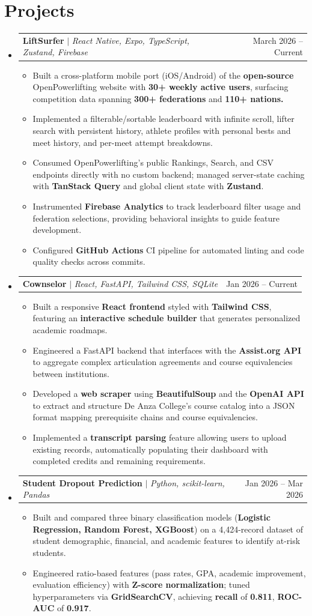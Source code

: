 \documentclass[letterpaper,11pt]{article}
\makeatletter
\newcommand{\resumeItem}[1]{
  \item\small{
    {#1 \vspace{-2pt}}
  }
}
\newcommand{\resumeProjectHeading}[2]{
    \item
    \begin{tabular*}{0.97\textwidth}{l@{\extracolsep{\fill}}r}
      \small#1 & #2 \\
    \end{tabular*}\vspace{-7pt}
}
\newcommand{\resumeSubHeadingListStart}{\begin{itemize}[leftmargin=0.15in, label={}]}
\newcommand{\resumeSubHeadingListEnd}{\end{itemize}}
\newcommand{\resumeItemListStart}{\begin{itemize}}
\newcommand{\resumeItemListEnd}{\end{itemize}\vspace{-5pt}}
\makeatother
\begin{document}
\section{Projects}
    \resumeSubHeadingListStart
      \resumeProjectHeading
    {\textbf{LiftSurfer} $|$ \emph{React Native, Expo, TypeScript, Zustand, Firebase}}{March 2026 -- Current}
    \resumeItemListStart
      \resumeItem{Built a cross-platform mobile port (iOS/Android) of the \textbf{open-source} OpenPowerlifting website with \textbf{30+ weekly active users}, surfacing competition data spanning \textbf{300+ federations} and \textbf{110+ nations.}}
      \resumeItem{Implemented a filterable/sortable leaderboard with infinite scroll, lifter search with persistent history, athlete profiles with personal bests and meet history, and per-meet attempt breakdowns.}
      \resumeItem{Consumed OpenPowerlifting's public Rankings, Search, and CSV endpoints directly with no custom backend; managed server-state caching with \textbf{TanStack Query} and global client state with \textbf{Zustand}.}
      \resumeItem{Instrumented \textbf{Firebase Analytics} to track leaderboard filter usage and federation selections, providing behavioral insights to guide feature development.}
      \resumeItem{Configured \textbf{GitHub Actions} CI pipeline for automated linting and code quality checks across commits.}
    \resumeItemListEnd
      \resumeProjectHeading
          {\textbf{Cownselor} $|$ \emph{React, FastAPI, Tailwind CSS, SQLite}}{Jan 2026 -- Current}
          \resumeItemListStart
            \resumeItem{Built a responsive \textbf{React frontend }styled with \textbf{Tailwind CSS}, featuring an \textbf{interactive schedule builder} that generates personalized academic roadmaps.}
            \resumeItem{Engineered a FastAPI backend that interfaces with the \textbf{Assist.org API }to aggregate complex articulation agreements and course equivalencies between institutions.}
            \resumeItem{Developed a \textbf{web scraper} using \textbf{BeautifulSoup} and the \textbf{OpenAI API} to extract and structure De Anza College's course catalog into a JSON format mapping prerequisite chains and course equivalencies.}
            \resumeItem{Implemented a \textbf{transcript parsing }feature allowing users to upload existing records, automatically populating their dashboard with completed credits and remaining requirements.}
          \resumeItemListEnd
      \resumeProjectHeading
          {\textbf{Student Dropout Prediction} $|$ \emph{Python, scikit-learn, Pandas}}{Jan 2026 -- Mar 2026}
          \resumeItemListStart
            \resumeItem{Built and compared three binary classification models (\textbf{Logistic Regression, Random Forest, XGBoost}) on a 4,424-record dataset of student demographic, financial, and academic features to identify at-risk students.}
            \resumeItem{Engineered ratio-based features (pass rates, GPA, academic improvement, evaluation efficiency) with \textbf{Z-score normalization}; tuned hyperparameters via \textbf{GridSearchCV}, achieving \textbf{recall} of \textbf{0.811},\textbf{ ROC-AUC} of \textbf{0.917}.}
          \resumeItemListEnd
    \resumeSubHeadingListEnd
\end{document}
